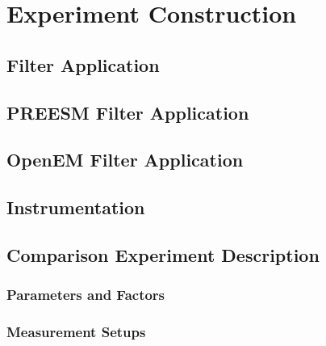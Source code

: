 \chapter{Experiment Construction}
\label{chapter:construction}


\section{Filter Application}
\label{sec:filterapp}


\section{PREESM Filter Application}
\label{sec:preesmapp}


\section{OpenEM Filter Application}
\label{sec:oemapp}


\section{Instrumentation}
\label{sec:instrumentation}


\section{Comparison Experiment Description}
\label{sec:experiment-description}


\subsection{Parameters and Factors}
\label{subsec:parameters-and-factors}


\subsection{Measurement Setups}
\label{subsec:measurement-setups}

